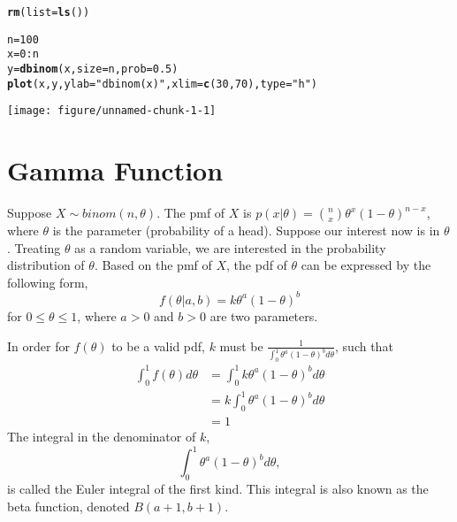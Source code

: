 \documentclass[12pt,oneside,english,american,flalign]{book}\usepackage[]{graphicx}\usepackage[]{color}
\makeatletter
\def\maxwidth{ %
  \ifdim\Gin@nat@width>\linewidth
    \linewidth
  \else
    \Gin@nat@width
  \fi
}
\newcommand{\hlnum}[1]{\textcolor[rgb]{0.686,0.059,0.569}{#1}}%
\newcommand{\hlstr}[1]{\textcolor[rgb]{0.192,0.494,0.8}{#1}}%
\newcommand{\hlopt}[1]{\textcolor[rgb]{0,0,0}{#1}}%
\newcommand{\hlstd}[1]{\textcolor[rgb]{0.345,0.345,0.345}{#1}}%
\newcommand{\hlkwb}[1]{\textcolor[rgb]{0.69,0.353,0.396}{#1}}%
\newcommand{\hlkwc}[1]{\textcolor[rgb]{0.333,0.667,0.333}{#1}}%
\newcommand{\hlkwd}[1]{\textcolor[rgb]{0.737,0.353,0.396}{\textbf{#1}}}%
\newenvironment{kframe}{%
 \def\at@end@of@kframe{}%
 \ifinner\ifhmode%
  \def\at@end@of@kframe{\end{minipage}}%
  \begin{minipage}{\columnwidth}%
 \fi\fi%
 \def\FrameCommand##1{\hskip\@totalleftmargin \hskip-\fboxsep
 \colorbox{shadecolor}{##1}\hskip-\fboxsep
     \hskip-\linewidth \hskip-\@totalleftmargin \hskip\columnwidth}%
 \MakeFramed {\advance\hsize-\width
   \@totalleftmargin\z@ \linewidth\hsize
   \@setminipage}}%
 {\par\unskip\endMakeFramed%
 \at@end@of@kframe}
\newenvironment{knitrout}{}{} %
\makeatother
\begin{document}
%
\begin{knitrout}
\color{fgcolor}\begin{kframe}
\begin{alltt}
\hlkwd{rm}\hlstd{(}\hlkwc{list}\hlstd{=}\hlkwd{ls}\hlstd{())}

\hlstd{n} \hlkwb{=} \hlnum{100}
\hlstd{x} \hlkwb{=} \hlnum{0}\hlopt{:}\hlstd{n}
\hlstd{y} \hlkwb{=} \hlkwd{dbinom}\hlstd{(x,} \hlkwc{size}\hlstd{=n,} \hlkwc{prob}\hlstd{=}\hlnum{0.5}\hlstd{)}
\hlkwd{plot}\hlstd{(x, y,} \hlkwc{ylab}\hlstd{=}\hlstr{"dbinom (x)"}\hlstd{,} \hlkwc{xlim}\hlstd{=}\hlkwd{c}\hlstd{(}\hlnum{30}\hlstd{,} \hlnum{70}\hlstd{),} \hlkwc{type}\hlstd{=}\hlstr{"h"}\hlstd{)}
\end{alltt}
\end{kframe}
\texttt{[image: figure/unnamed-chunk-1-1]} 

\end{knitrout}
%

\section{\label{subsec:Factorials-and-Gamma}Gamma Function}

\noindent Suppose $X\sim binom\left(n,\theta\right)$. The pmf of
$X$ is $p\left(x|\theta\right)=\binom{n}{x}\theta^{x}\left(1-\theta\right)^{n-x}$,
where $\theta$ is the parameter (probability of a head). Suppose
our interest now is in $\theta$. Treating $\theta$ as a random variable,
we are interested in the probability distribution of $\theta$. Based
on the pmf of $X$, the pdf of $\theta$ can be expressed by the following
form,
\[
f\left(\theta|a,b\right)=k\theta^{a}\left(1-\theta\right)^{b}
\]
for $0\leq\theta\leq1$, where $a>0$ and $b>0$ are two parameters.

In order for $f\left(\theta\right)$ to be a valid pdf, $k$ must
be $\frac{1}{\int_{0}^{1}\theta^{a}\left(1-\theta\right)^{b}d\theta}$,
such that
\begin{align*}
\int_{0}^{1}f\left(\theta\right)d\theta & =\int_{0}^{1}k\theta^{a}\left(1-\theta\right)^{b}d\theta\\
 & =k\int_{0}^{1}\theta^{a}\left(1-\theta\right)^{b}d\theta\\
 & =1
\end{align*}
The integral in the denominator of $k$, 
\[
\int_{0}^{1}\theta^{a}\left(1-\theta\right)^{b}d\theta,
\]
is called the Euler integral of the first kind. This integral is also
known as the beta function, denoted $B\left(a+1,b+1\right)$.
\end{document}
